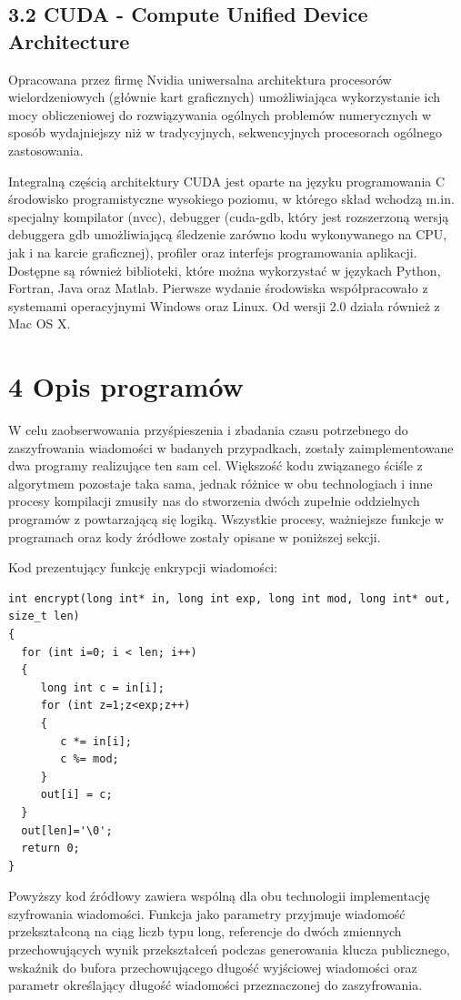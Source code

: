 \documentclass[a4paper,12pt]{article}
\begin{document}
\subsection*{3.2 CUDA - Compute Unified Device Architecture}

Opracowana przez firmę Nvidia uniwersalna architektura procesorów wielordzeniowych (głównie kart graficznych) umożliwiająca wykorzystanie ich mocy obliczeniowej do rozwiązywania ogólnych problemów numerycznych w sposób wydajniejszy niż w tradycyjnych, sekwencyjnych procesorach ogólnego zastosowania.

Integralną częścią architektury CUDA jest oparte na języku programowania C środowisko programistyczne wysokiego poziomu, w którego skład wchodzą m.in. specjalny kompilator (nvcc), debugger (cuda-gdb, który jest rozszerzoną wersją debuggera gdb umożliwiającą śledzenie zarówno kodu wykonywanego na CPU, jak i na karcie graficznej), profiler oraz interfejs programowania aplikacji. Dostępne są również biblioteki, które można wykorzystać w językach Python, Fortran, Java oraz Matlab. Pierwsze wydanie środowiska współpracowało z systemami operacyjnymi Windows oraz Linux. Od wersji 2.0 działa również z Mac OS X.


\newpage
\section*{4 Opis programów}

W celu zaobserwowania przyśpieszenia i zbadania czasu potrzebnego do zaszyfrowania wiadomości w badanych przypadkach, zostały zaimplementowane dwa programy realizujące ten sam cel. Większość kodu związanego ściśle z algorytmem pozostaje taka sama, jednak różnice w obu technologiach i inne procesy kompilacji zmusiły nas do stworzenia dwóch zupełnie oddzielnych programów z powtarzającą się logiką. Wszystkie procesy, ważniejsze funkcje w programach oraz kody źródłowe zostały opisane w poniższej sekcji.

Kod prezentujący funkcję enkrypcji wiadomości:
\begin{lstlisting}
int encrypt(long int* in, long int exp, long int mod, long int* out, size_t len)
{
  for (int i=0; i < len; i++)
  {
     long int c = in[i];
     for (int z=1;z<exp;z++)
     {
        c *= in[i];
        c %= mod;
     }
     out[i] = c;
  }
  out[len]='\0';
  return 0;
}

\end{lstlisting}

Powyższy kod źródłowy zawiera wspólną dla obu technologii implementację szyfrowania wiadomości. Funkcja jako parametry przyjmuje wiadomość przekształconą na ciąg liczb typu long, referencje do dwóch zmiennych przechowujących wynik przekształceń podczas generowania klucza publicznego, wskaźnik do bufora przechowującego długość wyjściowej wiadomości oraz parametr określający długość wiadomości przeznaczonej do zaszyfrowania.
\end{document}
